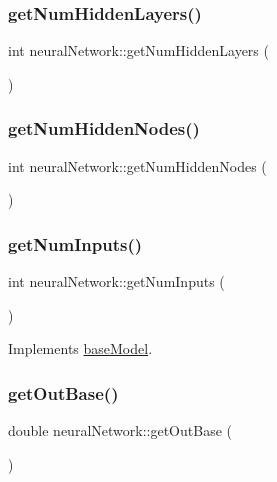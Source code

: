 \subsubsection{\texorpdfstring{get\+Num\+Hidden\+Layers()}{getNumHiddenLayers()}}
{\footnotesize\ttfamily int neural\+Network\+::get\+Num\+Hidden\+Layers (\begin{DoxyParamCaption}{ }\end{DoxyParamCaption})}

\mbox{\label{classneural_network_a679a628a34f70dd52f781c8c9dbd1a02}} 
\subsubsection{\texorpdfstring{get\+Num\+Hidden\+Nodes()}{getNumHiddenNodes()}}
{\footnotesize\ttfamily int neural\+Network\+::get\+Num\+Hidden\+Nodes (\begin{DoxyParamCaption}{ }\end{DoxyParamCaption})}

\mbox{\label{classneural_network_aaf9ff8b1a88126fcffc1e9f07a4ffe49}} 
\subsubsection{\texorpdfstring{get\+Num\+Inputs()}{getNumInputs()}}
{\footnotesize\ttfamily int neural\+Network\+::get\+Num\+Inputs (\begin{DoxyParamCaption}{ }\end{DoxyParamCaption})\hspace{0.3cm}{\ttfamily [virtual]}}



Implements \hyperlink{classbase_model_a1601088280ebe5be525fd1fe49d4b1e1}{base\+Model}.

\mbox{\label{classneural_network_a4524958a9de02bd5e48d0c991d634788}} 
\subsubsection{\texorpdfstring{get\+Out\+Base()}{getOutBase()}}
{\footnotesize\ttfamily double neural\+Network\+::get\+Out\+Base (\begin{DoxyParamCaption}{ }\end{DoxyParamCaption})}

